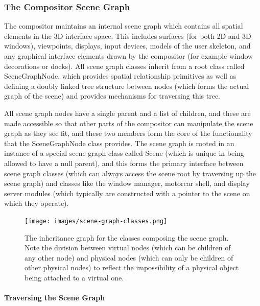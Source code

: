 \subsubsection{The Compositor Scene Graph}



The compositor maintains an internal scene graph which contains all spatial elements in the 3D interface space. This includes surfaces (for both 2D and 3D windows), viewpoints, displays, input devices, models of the user skeleton, and any graphical interface elements drawn by the compositor (for example window decorations or docks). All scene graph classes inherit from a root class called SceneGraphNode, which provides spatial relationship primitives as well as defining a doubly linked tree structure between nodes (which forms the actual graph of the scene) and provides mechanisms for traversing this tree. 

All scene graph nodes have a single parent and a list of children, and these are made accessible so that other parts of the compositor can manipulate the scene graph as they see fit, and these two members form the core of the functionality that the SceneGraphNode class provides. The scene graph is rooted in an instance of a special scene graph class called Scene (which is unique in being allowed to have a null parent), and this forms the primary interface between scene graph classes (which can always access the scene root by traversing up the scene graph) and classes like the window manager, motorcar shell, and display server modules (which typically are constructed with a pointer to the scene on which they operate).

\begin{figure}[ht!]
\centering
\texttt{[image: images/scene-graph-classes.png]}
\caption{The inheritance graph for the classes composing the scene graph. Note the division between virtual nodes (which can be children of any other node) and physical nodes (which can only be children of other physical nodes) to reflect the impossibility of a physical object being attached to a virtual one.}
\label{fig:scenegraph-classes}
\end{figure}

\paragraph{Traversing the Scene Graph}

